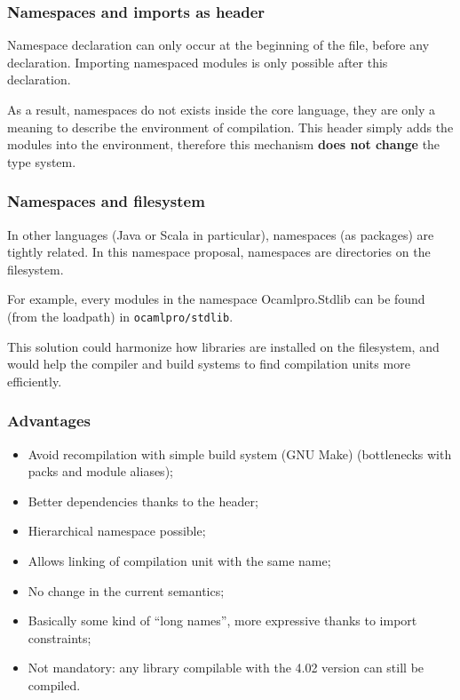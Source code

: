 \documentclass{beamer}
\begin{document}
\begin{frame}
\frametitle{Namespaces and imports as header}

Namespace declaration can only occur at the beginning of the file, before any
declaration. Importing namespaced modules is only possible after this
declaration.

\medskip

As a result, namespaces do not exists inside the core language, they are only a
meaning to describe the environment of compilation. This header simply adds the
modules into the environment, therefore this mechanism \textbf{does not change}
the type system.

\end{frame}

\begin{frame}[fragile]
\frametitle{Namespaces and filesystem}
In other languages (Java or Scala in particular), namespaces (as packages) are
tightly related. In this namespace proposal, namespaces are directories on the
filesystem.

\medskip

For example, every modules in the namespace Ocamlpro.Stdlib can be found (from
the loadpath) in \texttt{ocamlpro/stdlib}.

\medskip

This solution could harmonize how libraries are installed on the filesystem, and
would help the compiler and build systems to find compilation units more efficiently.

\end{frame}

\begin{frame}
\frametitle{Advantages}
\begin{itemize}[<+>]
\item Avoid recompilation with simple build system (GNU Make) (bottlenecks
  with packs and module aliases);
\item Better dependencies thanks to the header;
\item Hierarchical namespace possible;
\item Allows linking of compilation unit with the same name;
\item No change in the current semantics;
\item Basically some kind of ``long names'', more expressive thanks to import
  constraints;
\item Not mandatory: any library compilable with the 4.02 version can still be compiled.
\end{itemize}
\end{frame}
\end{document}
